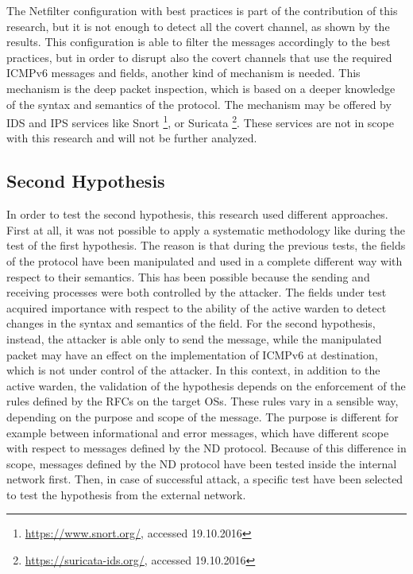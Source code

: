 \documentclass[12pt]{article}
\begin{document}
The Netfilter configuration with best practices is part of the contribution of this research, but it is not enough to detect all the covert channel, as shown by the results. This configuration is able to filter the messages accordingly to the best practices, but in order to disrupt also the covert channels that use the required ICMPv6 messages and fields, another kind of mechanism is needed. This mechanism is the deep packet inspection, which is based on a deeper knowledge of the syntax and semantics of the protocol. The mechanism may be offered by IDS and IPS services like Snort \footnote{\url{https://www.snort.org/}, accessed 19.10.2016}, or Suricata \footnote{\url{https://suricata-ids.org/}, accessed 19.10.2016}. These services are not in scope with this research and will not be further analyzed.


\subsection{Second Hypothesis}
\label{resultsSecondHypothesis}

In order to test the second hypothesis, this research used different approaches. First at all, it was not possible to apply a systematic methodology like during the test of the first hypothesis. The reason is that during the previous tests, the fields of the protocol have been manipulated and used in a complete different way with respect to their semantics. This has been possible because the sending and receiving processes were both controlled by the attacker. The fields under test acquired importance with respect to the ability of the active warden to detect changes in the syntax and semantics of the field. For the second hypothesis, instead, the attacker is able only to send the message, while the manipulated packet may have an effect on the implementation of ICMPv6 at destination, which is not under control of the attacker. In this context, in addition to the active warden, the validation of the hypothesis depends on the enforcement of the rules defined by the RFCs on the target OSs. These rules vary in a sensible way, depending on the purpose and scope of the message. The purpose is different for example between informational and error messages, which have different scope with respect to messages defined by the ND protocol. Because of this difference in scope, messages defined by the ND protocol have been tested inside the internal network first. Then, in case of successful attack, a specific test have been selected to test the hypothesis from the external network.
\end{document}
